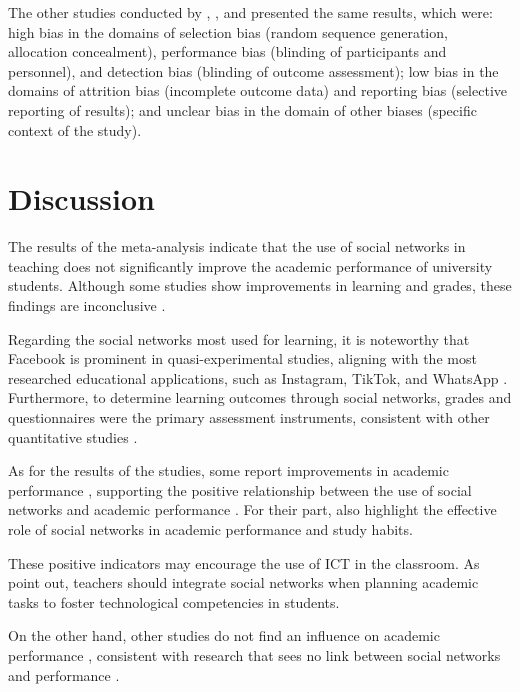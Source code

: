 \documentclass[english]{textolivre}
\begin{document}
The other studies conducted by \textcite{penalba2020}, \textcite{perezsuasnavas2022}, and \textcite{salasrueda2019} presented the same results, which were: high bias in the domains of selection bias (random sequence generation, allocation concealment), performance bias (blinding of participants and personnel), and detection bias (blinding of outcome assessment); low bias in the domains of attrition bias (incomplete outcome data) and reporting bias (selective reporting of results); and unclear bias in the domain of other biases (specific context of the study).


\section{Discussion}
The results of the meta-analysis indicate that the use of social networks in teaching does not significantly improve the academic performance of university students. Although some studies show improvements in learning and grades, these findings are inconclusive \cite{salasrueda2018, zulkifli2018}.

Regarding the social networks most used for learning, it is noteworthy that Facebook is prominent in quasi-experimental studies, aligning with the most researched educational applications, such as Instagram, TikTok, and WhatsApp \cite{lee2023}. Furthermore, to determine learning outcomes through social networks, grades and questionnaires were the primary assessment instruments, consistent with other quantitative studies \cite{asiedu2017, shafiq2023}.

As for the results of the studies, some report improvements in academic performance \cite{perezsuasnavas2022, salasrueda2019, salasrueda2018, zulkifli2018}, supporting the positive relationship between the use of social networks and academic performance \cite{asiedu2017, lee2023, shafiq2023}. For their part, \textcite{aiyende2021} also highlight the effective role of social networks in academic performance and study habits.

These positive indicators may encourage the use of ICT in the classroom. As \textcite{salasrueda2019} point out, teachers should integrate social networks when planning academic tasks to foster technological competencies in students.

On the other hand, other studies do not find an influence on academic performance \cite{alexiou2020, almarzouki2022, penalba2020}, consistent with research that sees no link between social networks and performance \cite{alfaris2018, suarezlantaron2022}.
\end{document}
